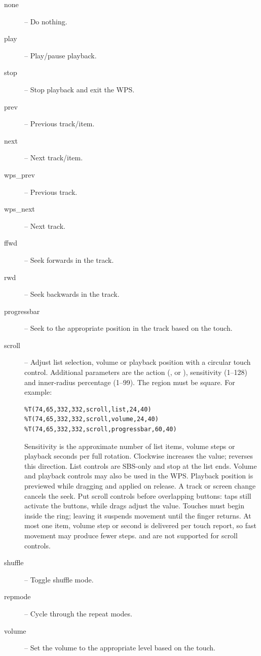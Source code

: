 {  \begin{description}
    \item[none] -- Do nothing.
    \item[play] -- Play/pause playback.
    \item[stop] -- Stop playback and exit the WPS.
    \item[prev] -- Previous track/item.
    \item[next] -- Next track/item.
    \item[wps\_prev] -- Previous track.
    \item[wps\_next] -- Next track.
    \item[ffwd] -- Seek forwards in the track.
    \item[rwd] -- Seek backwards in the track.
    \item[progressbar] -- Seek to the appropriate position in the track based on the touch.
    \item[scroll] -- Adjust list selection, volume or playback position
      with a circular touch control. Additional parameters are the action
      (,  or ), sensitivity
      (1--128) and inner-radius percentage (1--99). The region must be square.
      For example:
      \begin{verbatim}
%T(74,65,332,332,scroll,list,24,40)
%T(74,65,332,332,scroll,volume,24,40)
%T(74,65,332,332,scroll,progressbar,60,40)
      \end{verbatim}
      Sensitivity is the approximate number of list items, volume steps or
      playback seconds per full rotation. Clockwise increases the value;
       reverses this direction.
      List controls are SBS-only and stop at the list ends. Volume and playback
      controls may also be used in the WPS. Playback position is previewed
      while dragging and applied on release. A track or screen change
      cancels the seek.
      Put scroll controls before overlapping buttons: taps still activate the
      buttons, while drags adjust the value. Touches must begin inside the
      ring; leaving it suspends movement until the finger returns.
      At most one item, volume step or second is delivered per touch report,
      so fast movement may produce fewer steps.  and
       are not supported for scroll controls.
    \item[shuffle] -- Toggle shuffle mode.
    \item[repmode] -- Cycle through the repeat modes.
    \item[volume] -- Set the volume to the appropriate level based on the touch.

\end{description}}
